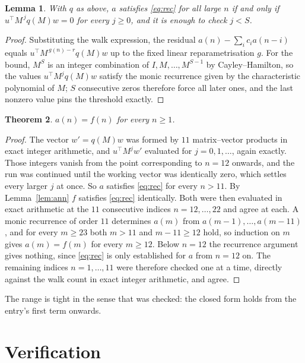 \documentclass[11pt,a4paper]{article}
\theoremstyle{plain}
\newtheorem{theorem}{Theorem}
\newtheorem{lemma}[theorem]{Lemma}
\theoremstyle{definition}
\begin{document}
\begin{lemma}\label{lem:crit}
With $q$ as above, $a$ satisfies \eqref{eq:rec} for all large $n$ if and only if
$u^{\!\top}M^{\,j}q(M)w=0$ for every $j\ge0$, and it is enough to check $j<S$.
\end{lemma}

\begin{proof}
Substituting the walk expression, the residual $a(n)-\sum_ic_ia(n-i)$ equals
$u^{\!\top}M^{\,g(n)-r}q(M)w$ up to the fixed linear reparametrisation $g$. For the bound,
$M^{S}$ is an integer combination of $I,M,\dots,M^{S-1}$ by Cayley--Hamilton, so the values
$u^{\!\top}M^{j}q(M)w$ satisfy the monic recurrence given by the characteristic polynomial of
$M$; $S$ consecutive zeros therefore force all later ones, and the last nonzero value pins the
threshold exactly.
\end{proof}

\begin{theorem}
$a(n)=f(n)$ for every $n\ge1$.
\end{theorem}

\begin{proof}
The vector $w'=q(M)w$ was formed by $11$ matrix--vector products in exact integer
arithmetic, and $u^{\!\top}M^{j}w'$ evaluated for $j=0,1,\dots$, again exactly. Those integers
vanish from the point corresponding to $n=12$ onwards, and the run was continued until the
working vector was identically zero, which settles every larger $j$ at once. So $a$ satisfies
\eqref{eq:rec} for every $n>11$. By Lemma~\ref{lem:ann} $f$ satisfies \eqref{eq:rec}
identically. Both were then evaluated in exact arithmetic at the $11$ consecutive indices
$n=12,\dots,22$ and agree at each. A monic recurrence of order $11$
determines $a(m)$ from $a(m-1),\dots,a(m-11)$, and for every $m\ge23$ both
$m>11$ and $m-11\ge12$ hold, so induction on $m$ gives $a(m)=f(m)$ for every
$m\ge12$.
Below $n=12$ the recurrence argument gives nothing, since \eqref{eq:rec} is only
established for $a$ from $n=12$ on. The remaining indices $n=1,\dots,11$ were
therefore checked one at a time, directly against the walk count in exact integer arithmetic,
and agree.
\end{proof}

The range is tight in the sense that was checked: the closed form holds from the entry's first term onwards.

\section{Verification}
\end{document}
